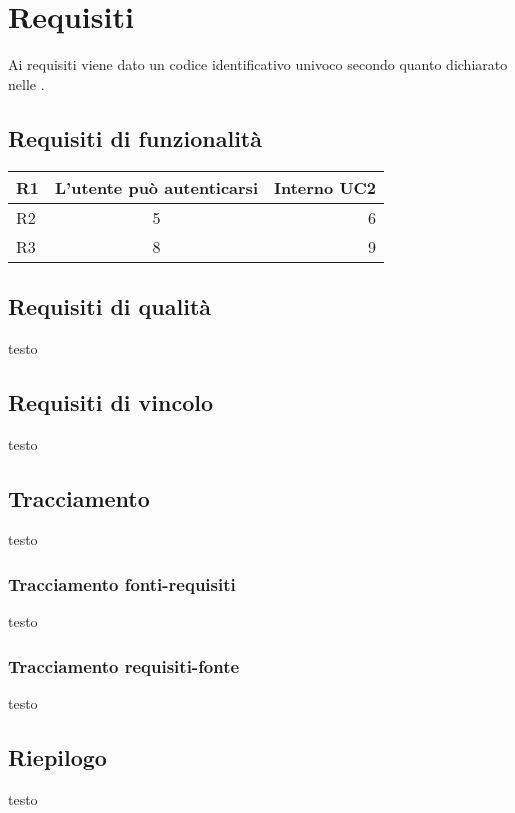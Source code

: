 \section{Requisiti}
Ai requisiti viene dato un codice identificativo univoco secondo quanto dichiarato nelle . 

	\subsection{Requisiti di funzionalità}
	
		
		\begin{tabular}{ l c r }
			R1 & L'utente può autenticarsi & Interno UC2 \\ \hline
			R2 & 5 & 6 \\ \hline
			R3 & 8 & 9 \\ \hline
		\end{tabular}
	
	\subsection{Requisiti di qualità}
	testo
	
	\subsection{Requisiti di vincolo}
	testo
	
	\subsection{Tracciamento}
	testo
	
		\subsubsection{Tracciamento fonti-requisiti}
		testo
		
		\subsubsection{Tracciamento requisiti-fonte}
		testo
		
	\subsection{Riepilogo}
	testo